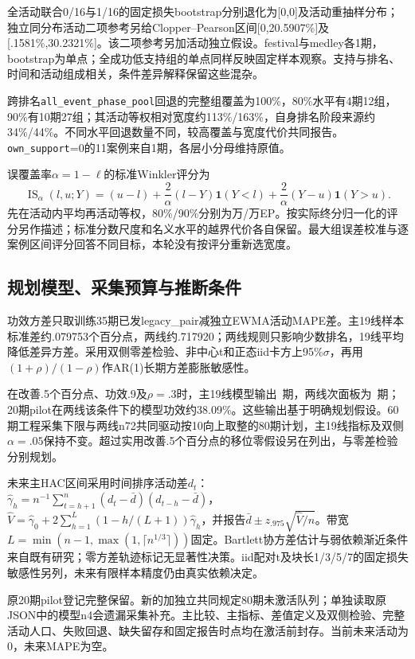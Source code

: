 全活动联合0/16与1/16的固定损失bootstrap分别退化为[0,0]及活动重抽样分布；独立同分布活动二项参考另给Clopper--Pearson区间[0,20.5907\%]及[.1581\%,30.2321\%]。该二项参考另加活动独立假设。festival与medley各1期，bootstrap为单点；全成功低支持组的单点同样反映固定样本观察。支持与排名、时间和活动组成相关，条件差异解释保留这些混杂。

跨排名\texttt{all\_event\_phase\_pool}回退的完整组覆盖为100\%，80\%水平有4期12组，90\%有10期27组；其活动等权相对宽度约113\%/163\%，自身排名阶段来源约34\%/44\%。不同水平回退数量不同，较高覆盖与宽度代价共同报告。\texttt{own\_support}=0的11案例来自1期，各层小分母维持原值。

误覆盖率\(\alpha=1-\ell\)的标准Winkler评分\citep{gneiting2007proper}为
\begin{equation}
\operatorname{IS}_{\alpha}(l,u;Y)=(u-l)+\frac2\alpha(l-Y)\mathbf1(Y<l)+\frac2\alpha(Y-u)\mathbf1(Y>u).
\end{equation}
先在活动内平均再活动等权，80\%/90\%分别为\EWinklerEighty 万/\EWinklerNinety 万EP。按实际终分归一化的评分另作描述；标准分数尺度和名义水平的越界代价各自保留。最大组误差校准与逐案例区间评分回答不同目标，本轮没有按评分重新选宽度。

\subsection{规划模型、采集预算与推断条件}
功效方差只取训练35期已发legacy\_pair减独立EWMA活动MAPE差。主19线样本标准差约.079753个百分点，两线约.717920；两线规则只影响少数排名，19线平均降低差异方差。采用双侧零差检验、非中心t和正态iid卡方上95\%\(\sigma\)，再用\((1+\rho)/(1-\rho)\)作AR(1)长期方差膨胀敏感性。


在改善.5个百分点、功效.9及\(\rho=.3\)时，主19线模型输出\ConfirmGlobalN\ 期，两线次面板为\ConfirmPairN\ 期；20期pilot在两线该条件下的模型功效约38.09\%。这些输出基于明确规划假设。60期工程采集下限与两线n72共同驱动按10向上取整的80期计划，主19线指标及双侧\(\alpha=.05\)保持不变。超过实用改善.5个百分点的移位零假设另在列出，与零差检验分别规划。

未来主HAC区间采用时间排序活动差\(d_t\)：\(\widehat\gamma_h=n^{-1}\sum_{t=h+1}^n(d_t-\bar d)(d_{t-h}-\bar d)\)，\(\widehat V=\widehat\gamma_0+2\sum_{h=1}^L(1-h/(L+1))\widehat\gamma_h\)，并报告\(\bar d\pm z_{.975}\sqrt{\widehat V/n}\)。带宽\(L=\min(n-1,\max(1,\lceil n^{1/3}\rceil))\)固定。Bartlett协方差估计与弱依赖渐近条件来自既有研究\citep{newey1987hac}；零方差轨迹标记无显著性决策。iid配对t及块长1/3/5/7的固定损失敏感性另列，未来有限样本精度仍由真实依赖决定。

原20期pilot登记完整保留。新的加独立共同规定80期未激活队列；单独读取原JSON中的模型n4会遗漏采集补充。主比较、主指标、差值定义及双侧检验、完整活动人口、失败回退、缺失留存和固定报告时点均在激活前封存。当前未来活动为0，未来MAPE为空。
